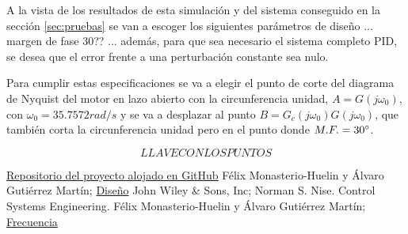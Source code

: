 \documentclass[a4paper]{article}
\begin{document}
A la vista de los resultados de esta simulación y del sistema conseguido en la sección \ref{sec:pruebas} se van a escoger los siguientes parámetros de diseño
... margen de fase 30\degree ?? ... además, para que sea necesario el sistema completo PID, se desea que el error frente a una perturbación constante sea nulo.

Para cumplir estas especificaciones se va a elegir el punto de corte del diagrama de Nyquist del motor en lazo abierto con la circunferencia unidad, $A=G(j\omega_0)$,
con $\omega_0 = 35.7572 rad/s$ y se va a desplazar al punto $B=G_c(j\omega_0) G(j\omega_0)$, que también corta la circunferencia unidad pero en el punto donde $M.F. = 30\degree$.

\begin{equation}
LLAVE CON LOS PUNTOS
\end{equation}





\begin{thebibliography}{9}
 \href{https://github.com/avicarioe/telelabo}{Repositorio del proyecto alojado en GitHub}
 Félix Monasterio-Huelin y Álvaro Gutiérrez Martín;
\href{http://www.robolabo.etsit.upm.es/asignaturas/seco/apuntes/design.pdf}{Diseño}
 John Wiley \& Sons, Inc; Norman S. Nise. Control Systems Engineering.
 Félix Monasterio-Huelin y Álvaro Gutiérrez Martín;
\href{Félix Monasterio-Huelin y Álvaro Gutiérrez Martín;} {Frecuencia}


\end{thebibliography}
\end{document}
